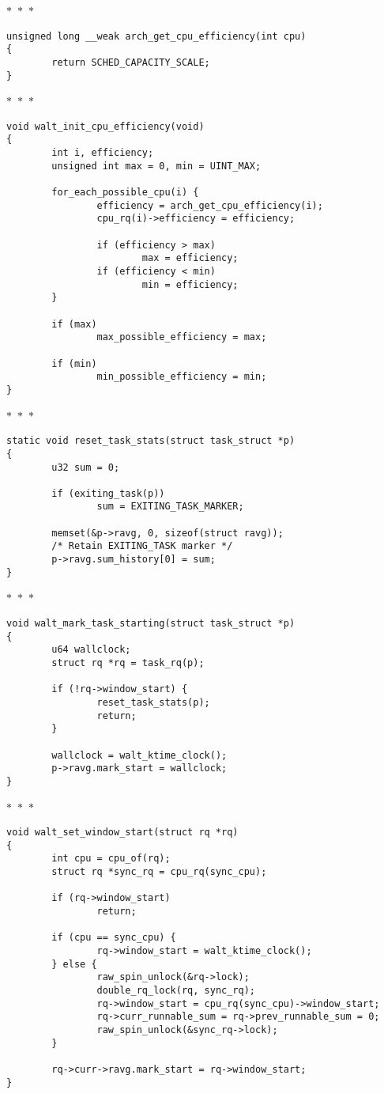 \documentclass{article}
\newcommand{\divider}{{\begin{center}
  $\ast$~$\ast$~$\ast$
\end{center}}}
\begin{document}
\divider
\begin{verbatim}
unsigned long __weak arch_get_cpu_efficiency(int cpu)
{
        return SCHED_CAPACITY_SCALE;
}
\end{verbatim}
\divider
\begin{verbatim}
void walt_init_cpu_efficiency(void)
{
        int i, efficiency;
        unsigned int max = 0, min = UINT_MAX;

        for_each_possible_cpu(i) {
                efficiency = arch_get_cpu_efficiency(i);
                cpu_rq(i)->efficiency = efficiency;

                if (efficiency > max)
                        max = efficiency;
                if (efficiency < min)
                        min = efficiency;
        }

        if (max)
                max_possible_efficiency = max;

        if (min)
                min_possible_efficiency = min;
}
\end{verbatim}
\divider
\begin{verbatim}
static void reset_task_stats(struct task_struct *p)
{
        u32 sum = 0;

        if (exiting_task(p))
                sum = EXITING_TASK_MARKER;

        memset(&p->ravg, 0, sizeof(struct ravg));
        /* Retain EXITING_TASK marker */
        p->ravg.sum_history[0] = sum;
}
\end{verbatim}
\divider
\begin{verbatim}
void walt_mark_task_starting(struct task_struct *p)
{
        u64 wallclock;
        struct rq *rq = task_rq(p);

        if (!rq->window_start) {
                reset_task_stats(p);
                return;
        }

        wallclock = walt_ktime_clock();
        p->ravg.mark_start = wallclock;
}
\end{verbatim}
\divider
\begin{verbatim}
void walt_set_window_start(struct rq *rq)
{
        int cpu = cpu_of(rq);
        struct rq *sync_rq = cpu_rq(sync_cpu);

        if (rq->window_start)
                return;

        if (cpu == sync_cpu) {
                rq->window_start = walt_ktime_clock();
        } else {
                raw_spin_unlock(&rq->lock);
                double_rq_lock(rq, sync_rq);
                rq->window_start = cpu_rq(sync_cpu)->window_start;
                rq->curr_runnable_sum = rq->prev_runnable_sum = 0;
                raw_spin_unlock(&sync_rq->lock);
        }

        rq->curr->ravg.mark_start = rq->window_start;
}
\end{verbatim}
\end{document}
